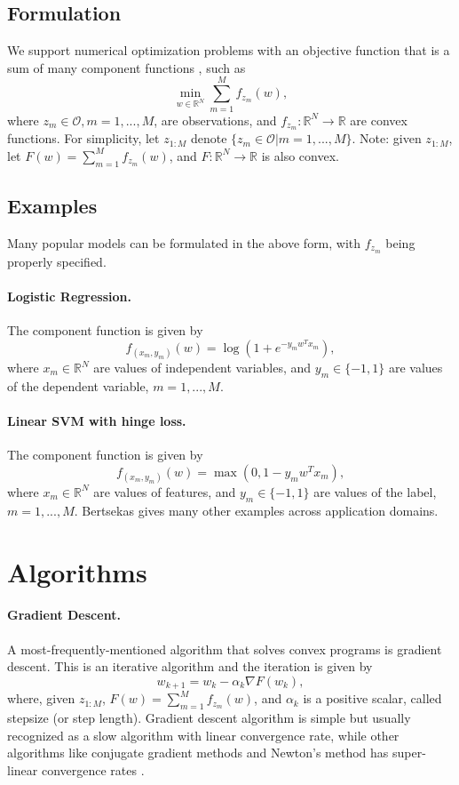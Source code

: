 \subsection{Formulation}
We support numerical optimization problems with an objective function that is a sum of many component functions \cite{springerlink:10.1007/s10107-011-0472-0}, such as
\[\min_{w \in \mathbb{R}^N} \sum_{m=1}^M f_{z_m}(w),\]
where $z_m \in \mathcal{O}, m = 1,...,M$, are observations, and $f_{z_m} : \mathbb{R}^N \to \mathbb{R}$ are convex functions.
For simplicity, let $z_{1:M}$ denote $\{z_m \in \mathcal{O} | m = 1,...,M\}$.
Note: given $z_{1:M}$, let $F(w) = \sum_{m=1}^M f_{z_m}(w)$, and $F : \mathbb{R}^N \to \mathbb{R}$ is also convex.

\subsection{Examples}
Many popular models can be formulated in the above form, with $f_{z_m}$ being properly specified.

\paragraph{Logistic Regression.} The component function is given by
\[f_{(x_m, y_m)}(w) = \log(1 + e^{- y_m w^{T} x_m}),\]
where $x_m \in \mathbb{R}^N$ are values of independent variables, and $y_m \in \{-1, 1\}$ are values of the dependent variable, $m = 1,...,M$.

\paragraph{Linear SVM with hinge loss.} The component function is given by
\[f_{(x_m, y_m)}(w) = \max(0, 1 - y_m w^{T} x_m),\]
where $x_m \in \mathbb{R}^N$ are values of features, and $y_m \in \{-1, 1\}$ are values of the label, $m = 1,...,M$.
Bertsekas \cite{springerlink:10.1007/s10107-011-0472-0} gives many other examples across application domains.

\section{Algorithms}
\paragraph{Gradient Descent.}
A most-frequently-mentioned algorithm that solves convex programs is gradient descent.
This is an iterative algorithm and the iteration is given by
\[w_{k+1} = w_k - \alpha_k \nabla F(w_k),\]
where, given $z_{1:M}$, $F(w) = \sum_{m=1}^M f_{z_m}(w)$, and $\alpha_k$ is a positive scalar, called stepsize (or step length).
Gradient descent algorithm is simple but usually recognized as a slow algorithm with linear convergence rate, while other algorithms like conjugate gradient methods and Newton's method has super-linear convergence rates \cite{nocedal2006numerical}.

